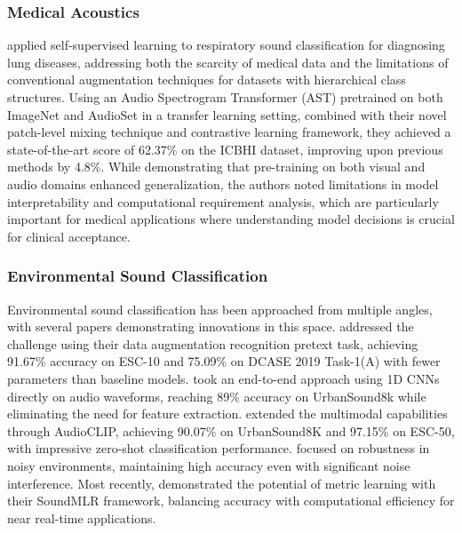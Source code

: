 \documentclass[11pt]{article}
\begin{document}
\subsubsection{Medical Acoustics}
\citep{Bae_2023} applied self-supervised learning to respiratory sound classification for diagnosing lung diseases, addressing both the scarcity of medical data and the limitations of conventional augmentation techniques for datasets with hierarchical class structures. Using an Audio Spectrogram Transformer (AST) pretrained on both ImageNet and AudioSet in a transfer learning setting, combined with their novel patch-level mixing technique and contrastive learning framework, they achieved a state-of-the-art score of 62.37\% on the ICBHI dataset, improving upon previous methods by 4.8\%. While demonstrating that pre-training on both visual and audio domains enhanced generalization, the authors noted limitations in model interpretability and computational requirement analysis, which are particularly important for medical applications where understanding model decisions is crucial for clinical acceptance.

\subsubsection{Environmental Sound Classification}
Environmental sound classification has been approached from multiple angles, with several papers demonstrating innovations in this space. \citep{TRIPATHI2021108183} addressed the challenge using their data augmentation recognition pretext task, achieving 91.67\% accuracy on ESC-10 and 75.09\% on DCASE 2019 Task-1(A) with fewer parameters than baseline models. \citep{abdoli2019endtoendenvironmentalsoundclassification} took an end-to-end approach using 1D CNNs directly on audio waveforms, reaching 89\% accuracy on UrbanSound8k while eliminating the need for feature extraction.\citep{guzhov2021audioclipextendingclipimage} extended the multimodal capabilities through AudioCLIP, achieving 90.07\% on UrbanSound8K and 97.15\% on ESC-50, with impressive zero-shot classification performance. \citep{app14219711} focused on robustness in noisy environments, maintaining high accuracy even with significant noise interference. Most recently, \citep{CHEN2025110593} demonstrated the potential of metric learning with their SoundMLR framework, balancing accuracy with computational efficiency for near real-time applications.
\end{document}
